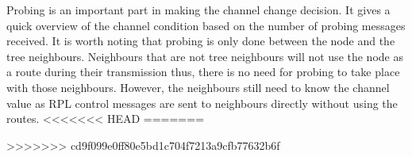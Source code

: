 Probing is an important part in making the channel change decision. It gives a quick overview of the channel condition based on the number of probing messages received. It is worth noting that probing is only done between the node and the tree neighbours. Neighbours that are not tree neighbours will not use the node as a route during their transmission thus, there is no need for probing to take place with those neighbours. However, the neighbours still need to know the channel value as RPL control messages are sent to neighbours directly without using the routes.
<<<<<<< HEAD
=======









>>>>>>> cd9f099e0ff80e5bd1c704f7213a9cfb77632b6f
